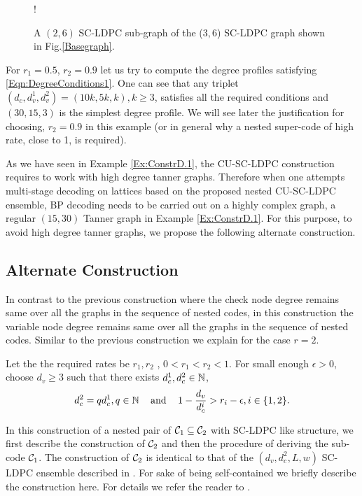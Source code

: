 \documentclass[journal,twocolumn]{IEEEtran}
\begin{document}
\begin{figure}[b]
\centering
\resizebox {\columnwidth} {!} {

}
\caption{A $(2,6)$ SC-LDPC sub-graph of the ($3,6$) SC-LDPC graph shown in Fig.\ref{Basegraph}.}
\label{BaseGraph_sup}
\end{figure}

\begin{Example}\label{Ex:ConstrD.1}
For $r_{1}=0.5$, $r_{2}=0.9$ let us try to compute the degree profiles satisfying \eqref{Eqn:DegreeConditions1}. One can see that      any triplet $(d_{c},d_{v}^{1},d_{v}^{2})=(10k, 5k, k), k\geq 3$, satisfies all the required conditions and $(30, 15, 3)$ is the simplest degree profile. We will see later the justification for choosing, $r_{2}=0.9$ in this example (or in general why a nested super-code of high rate, close to 1, is required).
\end{Example}
As we have seen in Example \ref{Ex:ConstrD.1}, the CU-SC-LDPC construction requires to work with high degree tanner graphs. Therefore when one attempts multi-stage decoding on lattices based on the proposed nested CU-SC-LDPC ensemble, BP decoding needs to be carried out on a highly complex graph, a regular $(15,30)$ Tanner graph in Example \ref{Ex:ConstrD.1}. For this purpose, to avoid high degree tanner graphs, we propose the following alternate construction.

\subsection{Alternate Construction}
In contrast to the previous construction where the check node degree remains same over all the graphs in the sequence of nested codes, in this construction the variable node degree remains same over all the graphs in the sequence of nested codes. Similar to the previous construction we explain for the case $r=2$.

Let the the required rates be $r_{1}, r_{2}$ , $0<r_{1}<r_{2}<1$. For small enough $\epsilon >0$, choose $d_{v}\geq 3$ such that there exists $d_{c}^{1},d_{c}^{2}\in \mathbb{N}$,
\begin{align}
		d_{c}^{2}=q d_{c}^{1}, q\in \mathbb{N} \hspace{0.3cm} \text{  and } \hspace{0.3cm}   1-\frac{d_{v}}{d_{c}^{i}}>r_{i}-\epsilon, i\in \{1,2\}.
\label{Eqn:DegreeConditions2}
\end{align}

In this construction of a nested pair of $\mathcal{C}_{1}\subseteq \mathcal{C}_{2}$ with SC-LDPC like structure, we first describe the construction of $\mathcal{C}_{2}$ and then the procedure of deriving the sub-code $\mathcal{C}_{1}$. The construction of $\mathcal{C}_{2}$ is identical to that of the $(d_{v},d_{c}^{2},L,w)$ SC-LDPC ensemble described in \cite{KudekarUrbanke11}. For sake of being self-contained we briefly describe the construction here. For details we refer the reader to  \cite{KudekarUrbanke11}.
\end{document}
